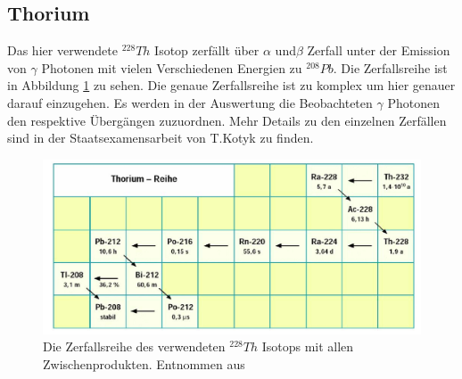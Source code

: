 \subsection{Thorium}
Das hier verwendete $^{228}Th$ Isotop zerfällt über $\alpha$ und$\beta$ Zerfall unter der Emission von $\gamma$ Photonen mit  vielen Verschiedenen Energien zu $^{208}Pb$. Die Zerfallsreihe ist in Abbildung \ref{Thorium_reihe} zu sehen. Die genaue Zerfallsreihe ist zu komplex um hier genauer darauf einzugehen. Es werden in der Auswertung die Beobachteten $\gamma$ Photonen den respektive Übergängen zuzuordnen. Mehr Details zu den einzelnen Zerfällen sind in der Staatsexamensarbeit von T.Kotyk \cite{staatsex_szinti} zu finden.

\begin{figure}
	\centering
	\includegraphics[scale=0.8]{Bilder/Thorium-Reihe}
	\caption[Zerfallsschema Europium]{\small Die Zerfallsreihe des verwendeten $^{228}Th$ Isotops mit allen Zwischenprodukten. Entnommen aus \cite{staatsex_szinti}}
	\label{Thorium_reihe}
\end{figure}